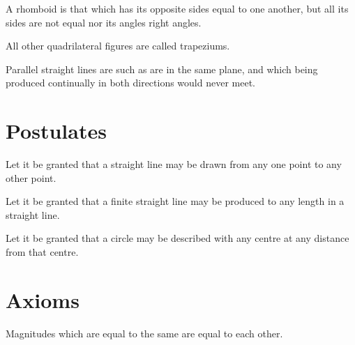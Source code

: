\documentclass[booklanguage=english]{byrnebook}
\begin{document}
\startdefinition{}
\begin{center}
\drawCurrentPictureInMargin[inside] A rhomboid is that which has its opposite sides equal to one another, but all its sides are not equal nor its angles right angles.
\end{center}

\startdefinition{}
\begin{center}
All other quadrilateral figures are called trapeziums.
\end{center}

\startdefinition{}
\begin{center}
\drawCurrentPictureInMargin[inside] Parallel straight lines are such as are in the same plane, and which being produced continually in both directions would never meet.
\end{center}

\chapter*{Postulates}

\startpostulate{}
Let it be granted that a straight line may be drawn from any one point to any other point.

\startpostulate{}
Let it be granted that a finite straight line may be produced to any length in a straight line.

\startpostulate{}
Let it be granted that a circle may be described with any centre at any distance from that centre.

\chapter*{Axioms}

\startaxiom{}
Magnitudes which are equal to the same are equal to each other.
\end{document}
